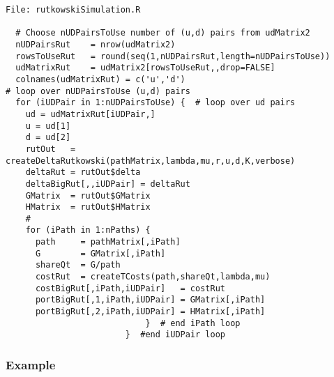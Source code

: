 \documentclass[10pt]{article}
\begin{document}
\begin{verbatim}
File: rutkowskiSimulation.R

  # Choose nUDPairsToUse number of (u,d) pairs from udMatrix2
  nUDPairsRut    = nrow(udMatrix2)
  rowsToUseRut   = round(seq(1,nUDPairsRut,length=nUDPairsToUse))
  udMatrixRut    = udMatrix2[rowsToUseRut,,drop=FALSE]
  colnames(udMatrixRut) = c('u','d')
# loop over nUDPairsToUse (u,d) pairs
  for (iUDPair in 1:nUDPairsToUse) {  # loop over ud pairs
    ud = udMatrixRut[iUDPair,]
    u = ud[1]
    d = ud[2]
    rutOut   = createDeltaRutkowski(pathMatrix,lambda,mu,r,u,d,K,verbose)
    deltaRut = rutOut$delta
    deltaBigRut[,,iUDPair] = deltaRut
    GMatrix  = rutOut$GMatrix
    HMatrix  = rutOut$HMatrix
    #
    for (iPath in 1:nPaths) {
      path     = pathMatrix[,iPath]
      G        = GMatrix[,iPath]
      shareQt  = G/path
      costRut  = createTCosts(path,shareQt,lambda,mu)
      costBigRut[,iPath,iUDPair]   = costRut
      portBigRut[,1,iPath,iUDPair] = GMatrix[,iPath]
      portBigRut[,2,iPath,iUDPair] = HMatrix[,iPath]
                            }  # end iPath loop
                        }  #end iUDPair loop
\end{verbatim}

\subsubsection*{Example}
\end{document}
